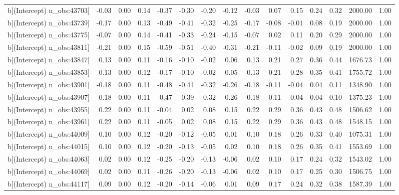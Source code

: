 \begin{table}[ht]
\begin{tabular}{rrrrrrrrrrrrrrr}
  b[(Intercept) n\_obs:43703] & -0.03 & 0.00 & 0.14 & -0.37 & -0.30 & -0.20 & -0.12 & -0.03 & 0.07 & 0.15 & 0.24 & 0.32 & 2000.00 & 1.00 \\ 
  b[(Intercept) n\_obs:43739] & -0.17 & 0.00 & 0.13 & -0.49 & -0.41 & -0.32 & -0.25 & -0.17 & -0.08 & -0.01 & 0.08 & 0.19 & 2000.00 & 1.00 \\ 
  b[(Intercept) n\_obs:43775] & -0.07 & 0.00 & 0.14 & -0.41 & -0.33 & -0.24 & -0.15 & -0.07 & 0.02 & 0.11 & 0.20 & 0.29 & 2000.00 & 1.00 \\ 
  b[(Intercept) n\_obs:43811] & -0.21 & 0.00 & 0.15 & -0.59 & -0.51 & -0.40 & -0.31 & -0.21 & -0.11 & -0.02 & 0.09 & 0.19 & 2000.00 & 1.00 \\ 
  b[(Intercept) n\_obs:43847] & 0.13 & 0.00 & 0.11 & -0.16 & -0.10 & -0.02 & 0.06 & 0.13 & 0.21 & 0.27 & 0.36 & 0.44 & 1676.73 & 1.00 \\ 
  b[(Intercept) n\_obs:43853] & 0.13 & 0.00 & 0.12 & -0.17 & -0.10 & -0.02 & 0.05 & 0.13 & 0.21 & 0.28 & 0.35 & 0.41 & 1755.72 & 1.00 \\ 
  b[(Intercept) n\_obs:43901] & -0.18 & 0.00 & 0.11 & -0.48 & -0.41 & -0.32 & -0.26 & -0.18 & -0.11 & -0.04 & 0.04 & 0.11 & 1348.90 & 1.00 \\ 
  b[(Intercept) n\_obs:43907] & -0.18 & 0.00 & 0.11 & -0.47 & -0.39 & -0.32 & -0.26 & -0.18 & -0.11 & -0.04 & 0.04 & 0.10 & 1375.23 & 1.00 \\ 
  b[(Intercept) n\_obs:43955] & 0.22 & 0.00 & 0.11 & -0.04 & 0.02 & 0.08 & 0.15 & 0.22 & 0.29 & 0.36 & 0.43 & 0.48 & 1506.62 & 1.00 \\ 
  b[(Intercept) n\_obs:43961] & 0.22 & 0.00 & 0.11 & -0.05 & 0.02 & 0.08 & 0.15 & 0.22 & 0.29 & 0.36 & 0.43 & 0.48 & 1548.15 & 1.00 \\ 
  b[(Intercept) n\_obs:44009] & 0.10 & 0.00 & 0.12 & -0.20 & -0.12 & -0.05 & 0.01 & 0.10 & 0.18 & 0.26 & 0.33 & 0.40 & 1075.31 & 1.00 \\ 
  b[(Intercept) n\_obs:44015] & 0.10 & 0.00 & 0.12 & -0.20 & -0.13 & -0.05 & 0.02 & 0.10 & 0.18 & 0.26 & 0.35 & 0.41 & 1553.69 & 1.00 \\ 
  b[(Intercept) n\_obs:44063] & 0.02 & 0.00 & 0.12 & -0.25 & -0.20 & -0.13 & -0.06 & 0.02 & 0.10 & 0.17 & 0.24 & 0.32 & 1543.02 & 1.00 \\ 
  b[(Intercept) n\_obs:44069] & 0.02 & 0.00 & 0.11 & -0.26 & -0.20 & -0.13 & -0.06 & 0.02 & 0.10 & 0.17 & 0.25 & 0.30 & 1506.75 & 1.00 \\ 
  b[(Intercept) n\_obs:44117] & 0.09 & 0.00 & 0.12 & -0.20 & -0.14 & -0.06 & 0.01 & 0.09 & 0.17 & 0.24 & 0.32 & 0.38 & 1587.39 & 1.00 \\ 

\end{tabular}
\end{table}
